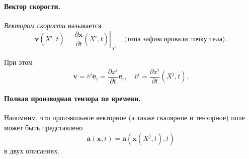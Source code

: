 \paragraph{Вектор скорости.}
\begin{definition*}
  \emph{Вектором скорости} называется
\begin{equation*}
\mathbf{v}\left(X^{i}, t\right)=\left.\frac{\partial \mathbf{x}}{\partial
t}\left(X^{i}, t\right)\right|_{X^{i}} \quad \text{(типа зафиксировали точку
тела)}.
\end{equation*}
\end{definition*}

При этом
\begin{equation*}
\mathbf{v}=\bar{v}^{i} \overline{\mathbf{e}}_{i}=\frac{\partial x^{i}}{\partial
t} \overline{\mathbf{e}}_{i}, \quad \bar{v}^{i}=\frac{\partial x^{i}}{\partial
t}\left(X^{j}, t\right).
\end{equation*}


\paragraph{Полная производная тензора по времени.} Напомним, что
произвольное векторное (а также скалярное и тензорное) поле может быть
представлено
\begin{equation*}
\mathbf{a}(\mathbf{x}, t)=\mathbf{a}\left(\mathbf{x}\left(X^{j}, t\right), t\right)
\end{equation*}
в двух описаниях.

